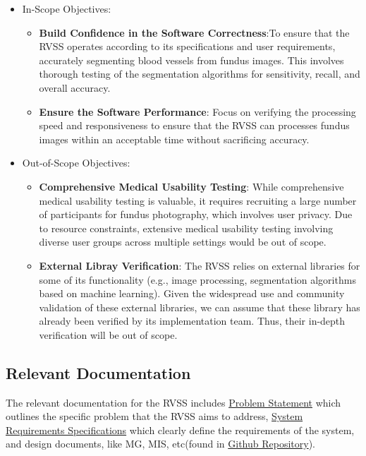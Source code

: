 \documentclass[12pt, titlepage]{article}
\begin{document}
\begin{itemize}
\item In-Scope Objectives:
\begin{itemize}
\item \textbf{Build Confidence in the Software Correctness}:To ensure that the RVSS operates according to its specifications and user requirements, accurately segmenting blood vessels from fundus images. This involves thorough testing of the segmentation algorithms for sensitivity, recall, and overall accuracy. 
\item \textbf{Ensure the Software Performance}: Focus on verifying the processing speed and responsiveness to ensure that the RVSS can processes fundus images within an acceptable time without sacrificing accuracy.
\end{itemize}

\item Out-of-Scope Objectives:
\begin{itemize}
\item \textbf{Comprehensive Medical Usability Testing}: While comprehensive medical usability testing is valuable, it requires recruiting a large number of participants for fundus photography, which involves user privacy. Due to resource constraints, extensive medical usability testing involving diverse user groups across multiple settings would be out of scope.
\item \textbf{External Libray Verification}: The RVSS relies on external libraries for some of its functionality (e.g., image processing, segmentation algorithms based on machine learning). Given the widespread use and community validation of these external libraries, we can assume that these library has already been verified by its implementation team. Thus, their in-depth verification will be out of scope.

\end{itemize}
\end{itemize}


\subsection{Relevant Documentation}

The relevant documentation for the RVSS includes \href{https://github.com/lele0007/Blood-vessel-segmentation/blob/main/docs/ProblemStatementAndGoals/ProblemStatement.pdf}{Problem Statement} which outlines the specific problem that the RVSS aims to address, \href{https://github.com/lele0007/Blood-vessel-segmentation/blob/main/docs/SRS/SRS.pdf}{System Requirements Specifications} which clearly define the requirements of the system, and design documents, like MG, MIS, etc(found in \href{https://github.com/lele0007/Blood-vessel-segmentation/blob/main/docs}{Github Repository}).  
\end{document}
